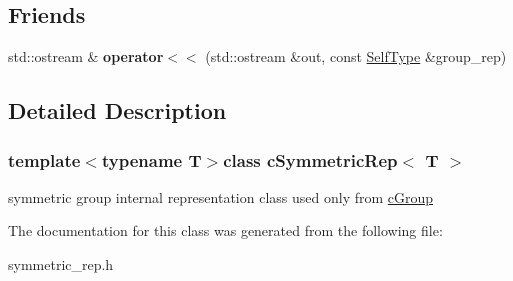 \subsection*{\-Friends}
\begin{DoxyCompactItemize}
\item 
\hypertarget{classcSymmetricRep_ad73abea0c910e6d44cac98fd4bc1a8a8}{
std\-::ostream \& {\bfseries operator$<$$<$} (std\-::ostream \&out, const \hyperlink{classcSymmetricRep}{\-Self\-Type} \&group\-\_\-rep)}
\label{classcSymmetricRep_ad73abea0c910e6d44cac98fd4bc1a8a8}

\end{DoxyCompactItemize}


\subsection{\-Detailed \-Description}
\subsubsection*{template$<$typename T$>$class c\-Symmetric\-Rep$<$ T $>$}

symmetric group internal representation class used only from \hyperlink{classcGroup}{c\-Group} 

\-The documentation for this class was generated from the following file\-:\begin{DoxyCompactItemize}
\item 
symmetric\-\_\-rep.\-h\end{DoxyCompactItemize}
